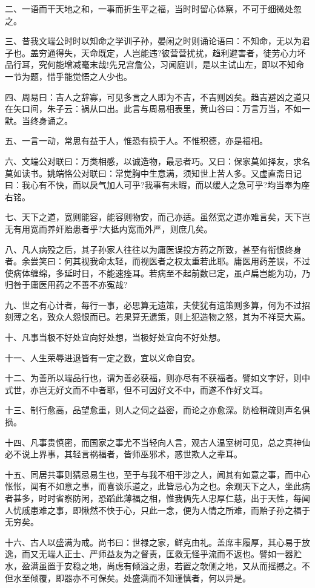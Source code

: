 \documentclass[letterpaper,12pt,english]{sphinxmanual}
\begin{document}
二、一语而干天地之和，一事而折生平之福，当时时留心体察，不可于细微处忽之。

三、昔我文端公时时以知命之学训子孙，晏闲之时则诵论语曰：不知命，无以为君子也。盖穷通得失，天命既定，人岂能违?彼营营扰扰，趋利避害者，徒劳心力坏品行耳，究何能增减毫末哉!先兄宫詹公，习闻庭训，是以主试山左，即以不知命一节为题，惜乎能觉悟之人少也。

四、周易曰：吉人之辞寡，可见多言之人即为不吉，不吉则凶矣。趋吉避凶之道只在矢口间，朱子云：祸从口出。此言与周易相表里，黄山谷曰：万言万当，不如一默。当终身诵之。

五、一言一动，常思有益于人，惟恐有损于人。不惟积德，亦是福相。

六、文端公对联曰：万类相感，以诚造物，最忌者巧。又曰：保家莫如择友，求名莫如读书。姚端恪公对联曰：常觉胸中生意满，须知世上苦人多。又虚直斋日记曰：我心有不快，而以戾气加人可乎?我事有未暇，而以缓人之急可乎?均当奉为座右铭。

七、天下之道，宽则能容，能容则物安，而己亦适。虽然宽之道亦难言矣，天下岂无有用宽而养奸贻患者乎?大抵内宽而外严，则庶几矣。

八、凡人病殁之后，其子孙家人往往以为庸医误投方药之所致，甚至有衔恨终身者。余尝笑曰：何其视我命太轻，而视医者之权太重若此耶。庸医用药差误，不过使病体缠绵，多延时日，不能速痊耳。若病至不起前数已定，虽卢扁岂能为功，乃归咎于庸医用药之不善不亦寃哉?

九、世之有心计者，每行一事，必思算无遗策，夫使犹有遗策则多算，何为不过招刻薄之名，致众人怨恨而已。若果算无遗策，则上犯造物之怒，其为不祥莫大焉。

十、凡事当极不好处宜向好处想，当极好处宜向不好处想。

十一、人生荣辱进退皆有一定之数，宜以义命自安。

十二、为善所以端品行也，谓为善必获福，则亦尽有不获福者。譬如文字好，则中式世，亦岂无好文而不中者耶，但不可因好文不中，而遂不作好文耳。

十三、制行愈高，品望愈重，则人之伺之益密，而论之亦愈深。防检稍疏则声名俱损。

十四、凡事贵慎密，而国家之事尤不当轻向人言，观古人温室树可见，总之真神仙必不说上界事，其轻言祸福者，皆师巫邪术，惑世欺人之辈耳。

十五、同居共事则猜忌易生也，至于与我不相干涉之人，闻其有如意之事，而中心怅怅，闻有不如意之事，而喜谈乐道之，此皆忌心为之也。余观天下之人，坐此病者甚多，时时省察防闲，恐蹈此薄福之相，惟我俩先人忠厚仁慈，出于天性，每闻人忧戚患难之事，即愀然不快于心，只此一念，便为人情之所难，而贻子孙之福于无穷矣。

十六、古人以盛满为戒。尚书曰：世禄之家，鲜克由礼。盖席丰履厚，其心易于放逸，而又无端人正士、严师益友为之督责，匡救无怪乎流而不返也。譬如一器贮水，盈满虽置于安稳之地，尚虑有倾溢之患，若置之欹侧之地，又从而摇撼之。不但水至倾覆，即器亦不可保矣。处盛满而不知谨慎者，何以异是。
\end{document}
